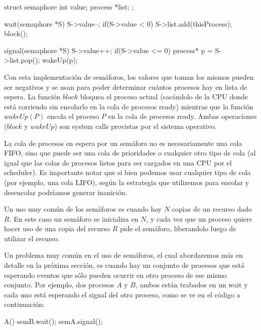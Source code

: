\documentclass{article}
\begin{document}
\begin{code}
struct semaphore{
    int value;
		process *list;
};
\end{code}

\begin{code}
wait(semaphore *S)
{
    S->value--;
		if(S->value < 0)
		{
		    S->list.add(thisProcess);
				block();
		}
}
\end{code}

\begin{code}
signal(semaphore *S)
{
    S->value++;
		if(S->value <= 0)
		{
		    process* p = S->list.pop();
		    wakeUp(p);
		}
}
\end{code}

Con esta implementaci\'on de sem\'aforos, los valores que toman los mismos pueden ser negativos y se usan para poder determinar cu\'antos procesos hay en lista de espera. La funci\'on $block$ bloquea el proceso actual (sac\'andolo de la CPU donde est\'a corriendo sin encolarlo en la cola de procesos ready) mientras que la funci\'on $wakeUp(P)$ encola el proceso $P$ en la cola de procesos ready. Ambas operaciones ($block$ y $wakeUp$) son system calls provistas por el sistema operativo.

La cola de procesos en espera por un sem\'aforo no es necesariamente una cola FIFO, sino que puede ser una cola de prioridades o cualquier otro tipo de cola (al igual que las colas de procesos listos para ser cargados en una CPU por el scheduler). Es importante notar que si bien podemos usar cualquier tipo de cola (por ejemplo, una cola LIFO), seg\'un la estrategia que utilizemos para encolar y desencolar podr\'iamos generar inanici\'on.

Un uso muy com\'un de los sem\'aforos es cuando hay $N$ copias de un recurso dado $R$. En este caso un sem\'aforo se inicializa en $N$, y cada vez que un proceso quiere hacer uso de una copia del recurso $R$ pide el sem\'aforo, liberandolo luego de utilizar el recurso.

Un problema muy com\'un en el uso de sem\'aforos, el cual abordaremos m\'as en detalle en la pr\'oxima secci\'on, es cuando hay un conjunto de procesos que est\'a esperando eventos que s\'olo pueden ocurrir en otro proceso de ese mismo conjunto. Por ejemplo, dos procesos $A$ y $B$, ambos est\'an trabados en un wait y cada uno est\'a esperando el signal del otro proceso, como se ve en el c\'odigo a continuaci\'on:

\begin{code}
A()
{
    semB.wait();
		semA.signal();
}
\end{code}
\end{document}
